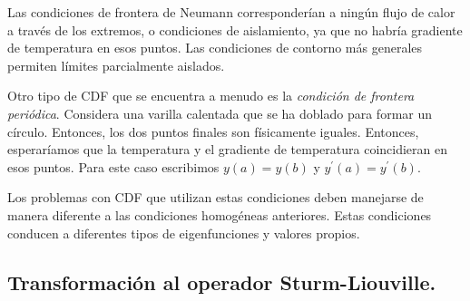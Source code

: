 \documentclass[12pt]{article}
\newcommand{\pderivada}[1]{\ensuremath{{#1}^{\prime}}}
\numberwithin{equation}{section}
\begin{document}
\par
Las condiciones de frontera de Neumann corresponderían a ningún flujo de calor a través de los extremos, o condiciones de aislamiento, ya que no habría gradiente de temperatura en esos puntos.  Las condiciones de contorno más generales permiten límites parcialmente aislados.
\par
Otro tipo de CDF que se encuentra a menudo es la \emph{condición de frontera periódica}. Considera una varilla calentada que se ha doblado para formar un círculo. Entonces, los dos puntos finales son físicamente iguales. Entonces, esperaríamos que la temperatura y el gradiente de temperatura coincidieran en esos puntos. Para este caso escribimos $y (a) = y (b)$ y $\pderivada{y} (a) = \pderivada{y} (b)$.
\par
Los problemas con CDF que utilizan estas condiciones deben manejarse de manera diferente a las condiciones homogéneas anteriores. Estas condiciones conducen a diferentes tipos de eigenfunciones y valores propios.

\subsection{Transformación al operador Sturm-Liouville.}
\end{document}
